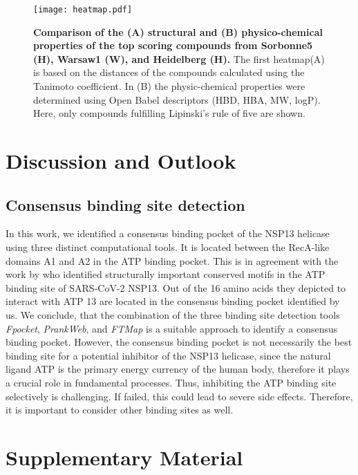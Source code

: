 \documentclass[11pt, letterpaper, titlepage]{article}
\begin{document}
\begin{figure}
    \centering
    \texttt{[image: heatmap.pdf]}
    \caption{\textbf{Comparison of the (A) structural and (B) physico-chemical properties of the top scoring compounds from Sorbonne5 (H), Warsaw1 (W), and Heidelberg (H).} The first heatmap(A) is based on the distances of the compounds calculated using the Tanimoto coefficient. In (B) the physic-chemical properties were determined using Open Babel descriptors (\acl{HBD}, \acl{HBA}, \acl{MW}, \acl{logP}). Here, only compounds fulfilling Lipinski's rule of five are shown.}
    \label{hc_properties} 
\end{figure}

\section{Discussion and Outlook}

\subsection{Consensus binding site detection}
In this work, we identified a consensus binding pocket of the NSP13 helicase using three distinct computational tools. It is located between the RecA-like domains A1 and A2 in the ATP binding pocket. This is in agreement with the work by \textcite{Berta_2021} who identified structurally important conserved motifs in the ATP binding site of SARS-CoV-2 NSP13. Out of the 16 amino acids they depicted to interact with ATP 13 are located in the consensus binding pocket identified by us. We conclude, that the combination of the three binding site detection tools \textit{Fpocket}, \textit{PrankWeb}, and \textit{FTMap} is a suitable approach to identify a consensus binding pocket. 
However, the consensus binding pocket is not necessarily the best binding site for a potential inhibitor of the NSP13 helicase, since the natural ligand ATP is the primary energy currency of the human body, therefore it plays a crucial role in fundamental processes. Thus, inhibiting the ATP binding site selectively is challenging. If failed, this could lead to severe side effects. Therefore, it is important to consider other binding sites as well. %



\section{Supplementary Material}

\pagebreak
\FloatBarrier

\renewcommand{\bibname}{References}  %
\printbibliography
\end{document}
